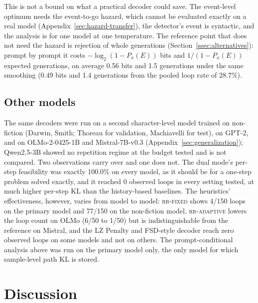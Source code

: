 \documentclass[11pt]{article}
\begin{document}
This is not a bound on what a practical decoder could save. The event-level optimum needs the event-to-go hazard, which cannot be evaluated exactly on a real model (Appendix~\ref{sec:hazard-transfer}), the detector's event is syntactic, and the analysis is for one model at one temperature. The reference point that does not need the hazard is rejection of whole generations (Section~\ref{ssec:alternatives}): prompt by prompt it costs $-\log_2(1-P_x(E))$ bits and $1/(1-P_x(E))$ expected generations, on average 0.56 bits and 1.5 generations under the same smoothing (0.49 bits and 1.4 generations from the pooled loop rate of 28.7\%).


\subsection{Other models}
\label{ssec:othermodels}
The same decoders were run on a second character-level model trained on non-fiction (Darwin, Smith; Thoreau for validation, Machiavelli for test), on GPT-2, and on OLMo-2-0425-1B and Mistral-7B-v0.3 (Appendix~\ref{sec:generalization}); Qwen2.5-3B showed no repetition regime at the budget tested and is not compared. Two observations carry over and one does not. The dual mode's per-step feasibility was exactly 100.0\% on every model, as it should be for a one-step problem solved exactly, and it reached 0 observed loops in every setting tested, at much higher per-step KL than the history-based baselines. The heuristics' effectiveness, however, varies from model to model: \textsc{rr-fixed} shows 4/150 loops on the primary model and 77/150 on the non-fiction model, \textsc{rr-adaptive} lowers the loop count on OLMo (6/50 to 1/50) but is indistinguishable from the reference on Mistral, and the LZ Penalty and FSD-style decoder reach zero observed loops on some models and not on others. The prompt-conditional analysis above was run on the primary model only, the only model for which sample-level path KL is stored.

\section{Discussion}
\label{ssec:discussion}
\end{document}
